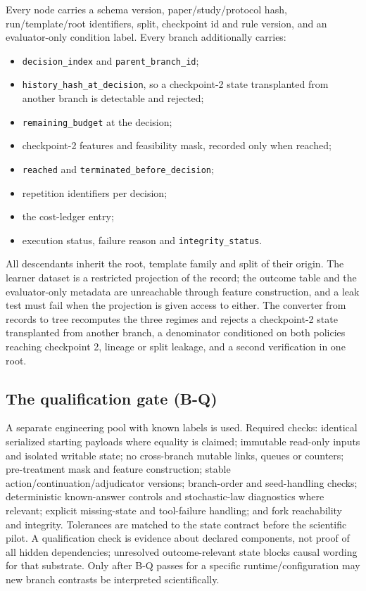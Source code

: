 Every node carries a schema version, paper/study/protocol hash, run/template/root
identifiers, split, checkpoint id and rule version, and an evaluator-only
condition label.  Every branch additionally carries:
\begin{itemize}[leftmargin=1.4em]
\item \texttt{decision\_index} and \texttt{parent\_branch\_id};
\item \texttt{history\_hash\_at\_decision}, so a checkpoint-2 state transplanted
  from another branch is detectable and rejected;
\item \texttt{remaining\_budget} at the decision;
\item checkpoint-2 features and feasibility mask, recorded only when reached;
\item \texttt{reached} and \texttt{terminated\_before\_decision};
\item repetition identifiers per decision;
\item the cost-ledger entry;
\item execution status, failure reason and \texttt{integrity\_status}.
\end{itemize}
All descendants inherit the root, template family and split of their origin.
The learner dataset is a restricted projection of the record; the outcome table
and the evaluator-only metadata are unreachable through feature construction,
and a leak test must fail when the projection is given access to either.  The
converter from records to tree recomputes the three regimes and rejects a
checkpoint-2 state transplanted from another branch, a denominator conditioned
on both policies reaching checkpoint 2, lineage or split leakage, and a second
verification in one root.

\subsection{The qualification gate (B-Q)}

A separate engineering pool with known labels is used.  Required checks:
identical serialized starting payloads where equality is claimed; immutable
read-only inputs and isolated writable state; no cross-branch mutable links,
queues or counters; pre-treatment mask and feature construction; stable
action/continuation/adjudicator versions; branch-order and seed-handling checks;
deterministic known-answer controls and stochastic-law diagnostics where
relevant; explicit missing-state and tool-failure handling; and fork
reachability and integrity.  Tolerances are matched to the state contract before
the scientific pilot.  A qualification check is evidence about declared
components, not proof of all hidden dependencies; unresolved outcome-relevant
state blocks causal wording for that substrate.  Only after B-Q passes for a
specific runtime/configuration may new branch contrasts be interpreted
scientifically.


